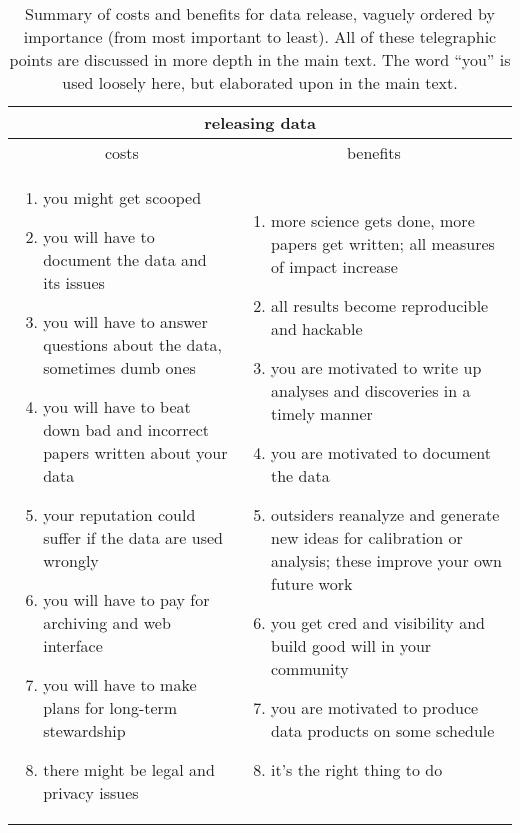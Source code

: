 \documentclass[12pt,twoside,pdftex]{article}
\begin{document}
\newlength{\cwidth}\setlength{\cwidth}{0.483\textwidth}%
\begin{table}%
\begin{tabular}{@{}p{\cwidth}|p{\cwidth}@{}}%
\multicolumn{2}{c}{\textbf{releasing data}} \\ \hline
\multicolumn{1}{c|}{costs} & \multicolumn{1}{c}{benefits} \\ \hline
\begin{enumerate}\raggedright
\item you might get scooped
\item you will have to document the data and its issues
\item you will have to answer questions about the data, sometimes dumb ones
\item you will have to beat down bad and incorrect papers written about your data
\item your reputation could suffer if the data are used wrongly
\item you will have to pay for archiving and web interface
\item you will have to make plans for long-term stewardship
\item there might be legal and privacy issues
\end{enumerate}&\begin{enumerate}\raggedright
\item more science gets done, more papers get written; all measures of impact increase
\item all results become reproducible and hackable
\item you are motivated to write up analyses and discoveries in a timely manner
\item you are motivated to document the data
\item outsiders reanalyze and generate new ideas for calibration or analysis; these improve your own future work
\item you get cred and visibility and build good will in your community
\item you are motivated to produce data products on some schedule
\item it's the right thing to do
\end{enumerate}\end{tabular}
\caption{Summary of costs and benefits for data release, vaguely
  ordered by importance (from most important to least). All of these
  telegraphic points are discussed in more depth in the main text. The
  word ``you'' is used loosely here, but elaborated upon in the main
  text.\label{tab:data}}
\end{table}
\end{document}

